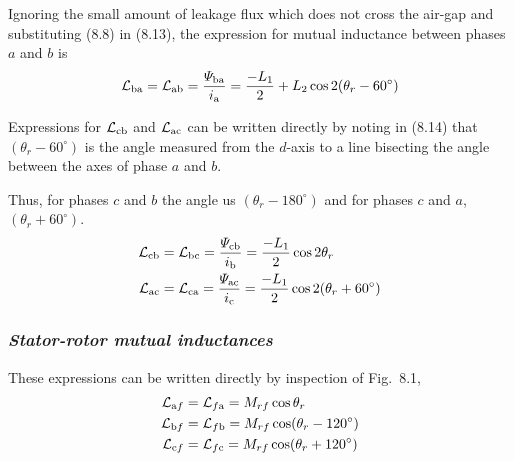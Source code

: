 \documentclass[a4paper,numbers=noenddot,12pt]{scrbook}
\begin{document}
        Ignoring the small amount of leakage flux which does not cross the air-gap and substituting (8.8) in (8.13), the expression for mutual inductance between phases $a$ and $b$ is
        \begin{equation}
            \mathcal{L}_{\textup{ba}} = \mathcal{L}_{\textup{ab}} = \dfrac{\varPsi_{\textup{ba}}}{i_{\textup{a}}} = \dfrac{-L_1}{2} + L_2 \cos 2(\theta_r - 60^{\circ})
            \label{eq:Eq8.14}
        \end{equation}

        Expressions for $\mathcal{L}_{\textup{cb}}$ and $\mathcal{L}_{\textup{ac}}$ can be written directly by noting in (8.14) that $(\theta_r - 60^{\circ})$ is the angle measured from the $d$-axis to a line bisecting the angle between the axes of phase $a$ and $b$.

        Thus, for phases $c$ and $b$ the angle us $(\theta_r - 180^{\circ})$ and for phases $c$ and $a$, $(\theta_r + 60^{\circ})$.
        \begin{align}
            \mathcal{L}_{\textup{cb}} & = \mathcal{L}_{\textup{bc}} = \dfrac{\varPsi_{\textup{cb}}}{i_{\textup{b}}} = \dfrac{-L_1}{2} \cos 2\theta_r \\
            \mathcal{L}_{\textup{ac}} & = \mathcal{L}_{\textup{ca}} = \dfrac{\varPsi_{\textup{ac}}}{i_{\textup{c}}} = \dfrac{-L_1}{2} \cos 2(\theta_r + 60^{\circ}) 
            \label{eq:Eq8.16}
        \end{align}

        \subsubsection{\textit{Stator-rotor mutual inductances}}
        These expressions can be written directly by inspection of Fig.\ 8.1,
        \begin{equation}
            \begin{aligned}
                \mathcal{L}_{\textup{a}f} & = \mathcal{L}_{f\textup{a}} = M_{rf} \cos \theta_r \\
                \mathcal{L}_{\textup{b}f} & = \mathcal{L}_{f\textup{b}} = M_{rf} \cos (\theta_r - 120^{\circ}) \\
                \mathcal{L}_{\textup{c}f} & = \mathcal{L}_{f\textup{c}} = M_{rf} \cos (\theta_r + 120^{\circ}) \\
            \end{aligned}
            \label{eq:Eq8.17}
        \end{equation}
\end{document}
